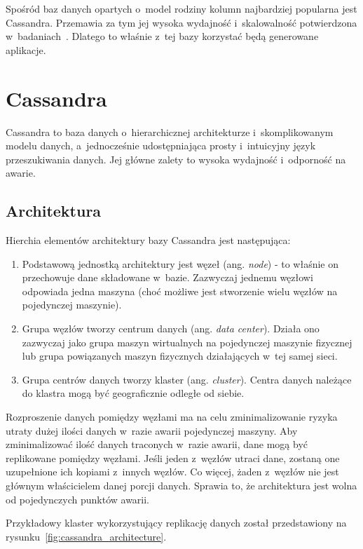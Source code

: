 Spośród baz danych opartych o~model rodziny kolumn najbardziej popularna jest Cassandra.
Przemawia za tym jej wysoka wydajność i~skalowalność potwierdzona w~badaniach~\cite{cassandra_perf}.
Dlatego to właśnie z~tej bazy korzystać będą generowane aplikacje.



\section{Cassandra}

Cassandra to baza danych o~hierarchicznej architekturze i~skomplikowanym modelu danych, a~jednocześnie udostępniająca prosty i~intuicyjny język przeszukiwania danych.
Jej główne zalety to wysoka wydajność i~odporność na awarie.


\subsection{Architektura}

Hierchia elementów architektury bazy Cassandra jest następująca:

\begin{enumerate}
 \item Podstawową jednostką architektury jest węzeł (ang. \emph{node}) - to właśnie on przechowuje dane składowane w~bazie.
 Zazwyczaj jednemu węzłowi odpowiada jedna maszyna (choć możliwe jest stworzenie wielu węzłów na pojedynczej maszynie).
 \item Grupa węzłów tworzy centrum danych (ang. \emph{data center}).
 Działa ono zazwyczaj jako grupa maszyn wirtualnych na pojedynczej maszynie fizycznej lub grupa powiązanych maszyn fizycznych działających w~tej samej sieci.
 \item Grupa centrów danych tworzy klaster (ang. \emph{cluster}).
 Centra danych należące do klastra mogą być geograficznie odległe od siebie.
\end{enumerate}

Rozproszenie danych pomiędzy węzłami ma na celu zminimalizowanie ryzyka utraty dużej ilości danych w~razie awarii pojedynczej maszyny.
Aby zminimalizować ilość danych traconych w~razie awarii, dane mogą być replikowane pomiędzy węzłami.
Jeśli jeden z~węzłów utraci dane, zostaną one uzupełnione ich kopiami z~innych węzłów.
Co więcej, żaden z~węzłów nie jest głównym właścicielem danej porcji danych.
Sprawia to, że architektura jest wolna od pojedynczych punktów awarii.

Przykładowy klaster wykorzystujący replikację danych został przedstawiony na rysunku~\ref{fig:cassandra_architecture}.

